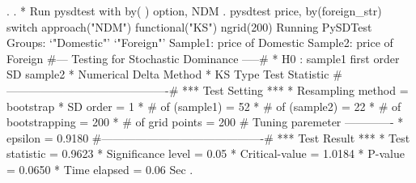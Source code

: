 . 
. * Run pysdtest with by( ) option, NDM
. pysdtest price, by(foreign_str) switch approach("NDM") functional("KS") ngrid(200)
Running PySDTest
Groups:
`"Domestic"' `"Foreign"'
Sample1: price of Domestic
Sample2: price of Foreign
{\smallskip}
\#--- Testing for Stochastic Dominance  -----\#
{\smallskip}
* H0 : sample1 first order SD sample2
* Numerical Delta Method
* KS Type Test Statistic 
{\smallskip}
\#-------------------------------------------\#
{\smallskip}
*** Test Setting ***
* Resampling method      = bootstrap
* SD order               =      1
* \# of (sample1)         =     52 
* \# of (sample2)         =     22
* \# of bootstrapping     =    200
* \# of grid points       =    200
{\smallskip}
\# Tuning paremeter -------------
* epsilon                = 0.9180
{\smallskip}
\#-------------------------------------------\#
{\smallskip}
*** Test Result ***
* Test statistic         = 0.9623
* Significance level     =  0.05
* Critical-value         = 1.0184
* P-value                = 0.0650
* Time elapsed           =  0.06 Sec
{\smallskip}
. 

